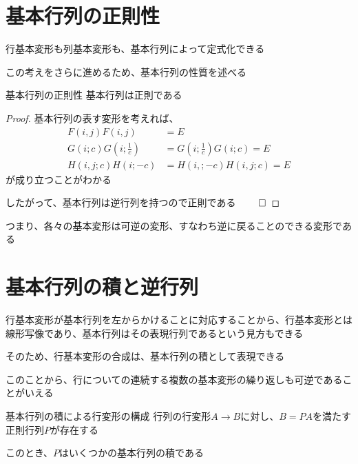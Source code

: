 \documentclass[../../../topic_linear-algebra]{subfiles}
\begin{document}
\sectionline
\section{基本行列の正則性}

行基本変形も列基本変形も、基本行列によって定式化できる

この考えをさらに進めるため、基本行列の性質を述べる

\begin{theorem}{基本行列の正則性}
  基本行列は正則である
\end{theorem}

\begin{proof}
  基本行列の表す変形を考えれば、
  \begin{align*}
    F(i,j)F(i,j)           & = E                          \\
    G(i;c)G(i;\frac{1}{c}) & = G(i;\frac{1}{c})G(i;c) = E \\
    H(i,j;c)H(i;-c)        & = H(i,;-c)H(i,j;c) = E
  \end{align*}
  が成り立つことがわかる

  したがって、基本行列は逆行列を持つので正則である $\qed$
\end{proof}

つまり、各々の基本変形は可逆の変形、すなわち逆に戻ることのできる変形である

\sectionline
\section{基本行列の積と逆行列}

行基本変形が基本行列を左からかけることに対応することから、行基本変形とは線形写像であり、基本行列はその表現行列であるという見方もできる

\br

そのため、行基本変形の合成は、基本行列の積として表現できる

\br

このことから、行についての連続する複数の基本変形の繰り返しも可逆であることがいえる

\begin{theorem}{基本行列の積による行変形の構成}\label{thm:row-operation-by-elementary-matrices}
  行列の行変形$A \to B$に対し、$B=PA$を満たす正則行列$P$が存在する

  このとき、$P$はいくつかの基本行列の積である
\end{theorem}
\end{document}

